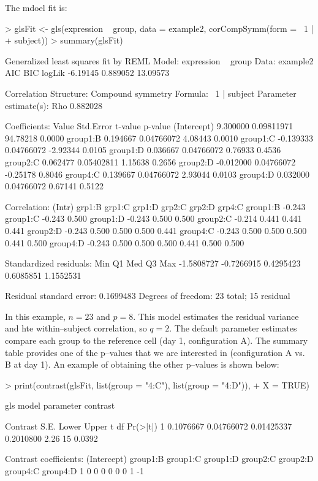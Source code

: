 \documentclass[12pt]{article}
\begin{document}
The mdoel fit is:
{\small
\begin{Schunk}
\begin{Sinput}
> glsFit <- gls(expression ~ group, data = example2, corCompSymm(form = ~1 | 
+     subject))
> summary(glsFit)
\end{Sinput}
\begin{Soutput}
Generalized least squares fit by REML
  Model: expression ~ group 
  Data: example2 
       AIC      BIC   logLik
  -6.19145 0.889052 13.09573

Correlation Structure: Compound symmetry
 Formula: ~1 | subject 
 Parameter estimate(s):
     Rho 
0.882028 

Coefficients:
                Value  Std.Error  t-value p-value
(Intercept)  9.300000 0.09811971 94.78218  0.0000
group1:B     0.194667 0.04766072  4.08443  0.0010
group1:C    -0.139333 0.04766072 -2.92344  0.0105
group1:D     0.036667 0.04766072  0.76933  0.4536
group2:C     0.062477 0.05402811  1.15638  0.2656
group2:D    -0.012000 0.04766072 -0.25178  0.8046
group4:C     0.139667 0.04766072  2.93044  0.0103
group4:D     0.032000 0.04766072  0.67141  0.5122

 Correlation: 
         (Intr) grp1:B grp1:C grp1:D grp2:C grp2:D grp4:C
group1:B -0.243                                          
group1:C -0.243  0.500                                   
group1:D -0.243  0.500  0.500                            
group2:C -0.214  0.441  0.441  0.441                     
group2:D -0.243  0.500  0.500  0.500  0.441              
group4:C -0.243  0.500  0.500  0.500  0.441  0.500       
group4:D -0.243  0.500  0.500  0.500  0.441  0.500  0.500

Standardized residuals:
       Min         Q1        Med         Q3        Max 
-1.5808727 -0.7266915  0.4295423  0.6085851  1.1552531 

Residual standard error: 0.1699483 
Degrees of freedom: 23 total; 15 residual
\end{Soutput}
\end{Schunk}
}
In this example, $n=23$ and $p=8$. This model estimates the residual variance and hte within--subject correlation, so $q=2$. The default parameter estimates compare each group to the reference cell (day 1, configuration A). The summary table provides one of the p--values that we are interested in (configuration A vs. B at day 1). An example of obtaining the other p--values is shown below:
{\small
\begin{Schunk}
\begin{Sinput}
> print(contrast(glsFit, list(group = "4:C"), list(group = "4:D")), 
+     X = TRUE)
\end{Sinput}
\begin{Soutput}
gls model parameter contrast

   Contrast       S.E.      Lower     Upper    t df Pr(>|t|)
1 0.1076667 0.04766072 0.01425337 0.2010800 2.26 15   0.0392

Contrast coefficients:
  (Intercept) group1:B group1:C group1:D group2:C group2:D group4:C group4:D
1           0        0        0        0        0        0        1       -1
\end{Soutput}
\end{Schunk}
}
\end{document}

